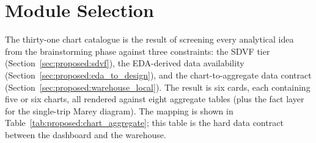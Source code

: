 \section{Module Selection}
\label{sec:proposed:modules}

The thirty-one chart catalogue is the result of screening every
analytical idea from the brainstorming phase against three
constraints: the SDVF tier (Section~\ref{sec:proposed:sdvf}),
the EDA-derived data availability
(Section~\ref{sec:proposed:eda_to_design}), and the
chart-to-aggregate data contract
(Section~\ref{sec:proposed:warehouse_local}). The result is six
cards, each containing five or six charts, all rendered against
eight aggregate tables (plus the fact layer for the single-trip
Marey diagram). The mapping is shown in
Table~\ref{tab:proposed:chart_aggregate}; this table is the hard
data contract between the dashboard and the warehouse.

